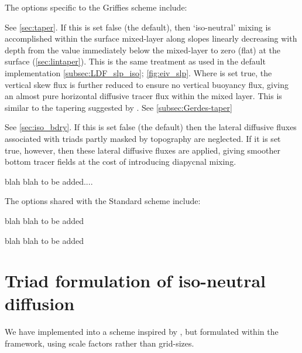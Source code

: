 \documentclass[../tex_main/NEMO_manual]{subfiles}
\begin{document}
The options specific to the Griffies scheme include:
\begin{description}[font=\normalfont]
\item[\np{ln\_triad\_iso}] See \autoref{sec:taper}. If this is set false (the default), then
  `iso-neutral' mixing is accomplished within the surface mixed-layer
  along slopes linearly decreasing with depth from the value immediately below
  the mixed-layer to zero (flat) at the surface (\autoref{sec:lintaper}). 
  This is the same treatment as used in the default implementation \autoref{subsec:LDF_slp_iso}; \autoref{fig:eiv_slp}.  
  Where  is set true, the vertical skew flux is further reduced 
  to ensure no vertical buoyancy flux, giving an almost pure
  horizontal diffusive tracer flux within the mixed layer. This is similar to
  the tapering suggested by \citet{Gerdes1991}. See \autoref{subsec:Gerdes-taper}
\item[\np{ln\_botmix\_triad}] See \autoref{sec:iso_bdry}. 
  If this is set false (the default) then the lateral diffusive fluxes
  associated with triads partly masked by topography are neglected. 
  If it is set true, however, then these lateral diffusive fluxes are applied, 
  giving smoother bottom tracer fields at the cost of introducing diapycnal mixing.
\item[\np{rn\_sw\_triad}]  blah blah to be added....
\end{description}
The options shared with the Standard scheme include:
\begin{description}[font=\normalfont]
\item[\np{ln\_traldf\_msc}]   blah blah to be added
\item[\np{rn\_slpmax}]  blah blah to be added
\end{description}

\section{Triad formulation of iso-neutral diffusion}
\label{sec:iso}
We have implemented into \NEMO a scheme inspired by \citet{Griffies_al_JPO98}, 
but formulated within the \NEMO framework, using scale factors rather than grid-sizes.
\end{document}
